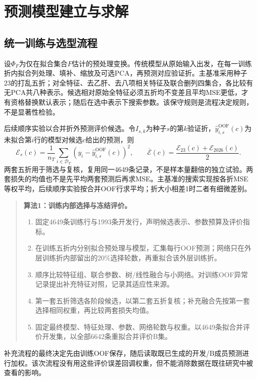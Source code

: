 \section{预测模型建立与求解}\label{sec:models}

\subsection{统一训练与选型流程}
设$\Phi_F$为仅在拟合集合$F$估计的预处理变换。传统模型从原始输入出发，在每一训练折内拟合列处理、填补、缩放及可选PCA，再预测对应验证折。主基准采用种子23的打乱五折；对全特征、去乙肝、去八项相关特征及联合删列四集合，各比较有无PCA共八种表示。候选相对原始全特征必须五折均不变差且平均MSE更低，才有资格替换默认表示；随后在选中表示下搜索参数。该保守规则是流程决定规则，不是显著性检验。

后续顺序实验以合并折外预测评价候选。令$I_{s,k}$为种子$s$的第$k$验证折，$\hat y_{i,s}^{\mathrm{OOF}}(c)$为未拟合第$i$行的模型对候选$c$给出的预测，则
\begin{equation}
\mathcal E_s(c)=\frac1{n_T}\sum_{i\in\mathcal D_T}(y_i-\hat y_{i,s}^{\mathrm{OOF}}(c))^2,
\qquad\overline{\mathcal E}(c)=\frac{\mathcal E_{23}(c)+\mathcal E_{2026}(c)}2.
\label{eq:oof}
\end{equation}
两套五折用于筛选与复核，复用同一4649条记录，不是样本量翻倍的独立试验。两套损失的均值也不是先平均两套预测后再求MSE。主基准的搜索实现按各折MSE等权平均，后续顺序实验按合并OOF行求平均；折大小相差1时二者有细微差别。

\begin{quote}
\textbf{算法1：训练内部选择与冻结评价。}
\begin{enumerate}
\item 固定4649条训练行与1993条开发行，声明候选表示、参数预算及评价指标。
\item 在训练五折内分别拟合预处理与模型，汇集每行OOF预测；网络只在外层训练折内部留出的20\%选择轮数，再重拟合该外层训练折。
\item 顺序比较特征组、联合参数、树/线性融合与小网络。对训练OOF异常记录提出补充特征对照，记录其适应性来源。
\item 第一套五折筛选各阶段候选，以第二套五折复核；补充融合先按第一套选择相同权重，再比较两套损失均值。
\item 固定最终模型、特征处理、参数、网络轮数与权重。以4649条拟合并评价开发集，以全部6642条重拟合并评价B集。
\end{enumerate}
\end{quote}
补充流程的最终决定先由训练OOF保存，随后读取既已生成的开发/B成员预测进行加权。该次流程没有用这些评价误差回调权重，但不能消除数据在既往研究中被查看的影响。

